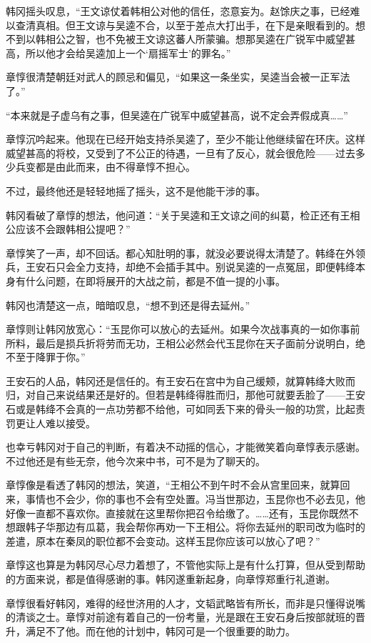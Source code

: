 韩冈摇头叹息，“王文谅仗着韩相公对他的信任，恣意妄为。赵馀庆之事，已经难以查清真相。但王文谅与吴逵不合，以至于差点大打出手，在下是亲眼看到的。想不到以韩相公之智，也不免被王文谅这蕃人所蒙骗。想那吴逵在广锐军中威望甚高，所以他才会给吴逵加上一个‘扇摇军士’的罪名。”

章惇很清楚朝廷对武人的顾忌和偏见，“如果这一条坐实，吴逵当会被一正军法了。”

“本来就是子虚乌有之事，但吴逵在广锐军中威望甚高，说不定会弄假成真……”

章惇沉吟起来。他现在已经开始支持杀吴逵了，至少不能让他继续留在环庆。这样威望甚高的将校，又受到了不公正的待遇，一旦有了反心，就会很危险——过去多少兵变都是由此而来，由不得章惇不担心。

不过，最终他还是轻轻地摇了摇头，这不是他能干涉的事。

韩冈看破了章惇的想法，他问道：“关于吴逵和王文谅之间的纠葛，检正还有王相公应该不会跟韩相公提吧？”

章惇笑了一声，却不回话。都心知肚明的事，就没必要说得太清楚了。韩绛在外领兵，王安石只会全力支持，却绝不会插手其中。别说吴逵的一点冤屈，即便韩绛本身有什么问题，在即将展开的大战之前，都是不值一提的小事。

韩冈也清楚这一点，暗暗叹息，“想不到还是得去延州。”

章惇则让韩冈放宽心：“玉昆你可以放心的去延州。如果今次战事真的一如你事前所料，最后是损兵折将劳而无功，王相公必然会代玉昆你在天子面前分说明白，绝不至于降罪于你。”

王安石的人品，韩冈还是信任的。有王安石在宫中为自己缓颊，就算韩绛大败而归，对自己来说结果还是好的。但若是韩绛得胜而归，那他可就要丢脸了——王安石或是韩绛不会真的一点功劳都不给他，可如同丢下来的骨头一般的功赏，比起责罚更让人难以接受。

也幸亏韩冈对于自己的判断，有着决不动摇的信心，才能微笑着向章惇表示感谢。不过他还是有些无奈，他今次来中书，可不是为了聊天的。

章惇像是看透了韩冈的想法，笑道，“王相公不到午时不会从宫里回来，就算回来，事情也不会少，你的事也不会有空处置。冯当世那边，玉昆你也不必去见，他好像一直都不喜欢你。直接就在这里帮你把召令给缴了。……还有，玉昆你既然不想跟韩子华那边有瓜葛，我会帮你再劝一下王相公。将你去延州的职司改为临时的差遣，原本在秦凤的职位都不会变动。这样玉昆你应该可以放心了吧？”

章惇这也算是为韩冈尽心尽力着想了，不管他实际上是有什么打算，但从受到帮助的方面来说，都是值得感谢的事。韩冈遂重新起身，向章惇郑重行礼道谢。

章惇很看好韩冈，难得的经世济用的人才，文韬武略皆有所长，而非是只懂得说嘴的清谈之士。章惇对前途有着自己的一份考量，光是跟在王安石身后按部就班的晋升，满足不了他。而在他的计划中，韩冈可是一个很重要的助力。

